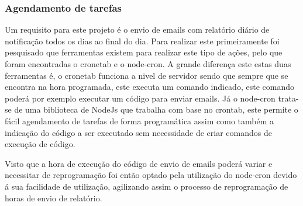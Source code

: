 \subsubsection{Agendamento de tarefas}

Um requisito para este projeto é o envio de emails com relatório diário de notificação todos os dias ao final do dia. Para realizar este primeiramente foi pesquisado que ferramentas existem para realizar este tipo de ações, pelo que foram encontradas o cronetab e o node-cron. A grande diferença este estas duas ferramentas é, o cronetab funciona a nivel de servidor sendo que sempre que se encontra na hora programada, este executa um comando indicado, este comando poderá por exemplo executar um código para enviar emails. Já o node-cron trata-se de uma biblioteca de NodeJs que trabalha com base no crontab, este permite o fácil agendamento de tarefas de forma programática assim como também a indicação do código a ser executado sem necessidade de criar comandos de execução de código.

Visto que a hora de execução do código de envio de emails poderá variar e necessitar de reprogramação foi então optado pela utilização do node-cron devido á sua facilidade de utilização, agilizando assim o processo de reprogramação de horas de envio de relatório.